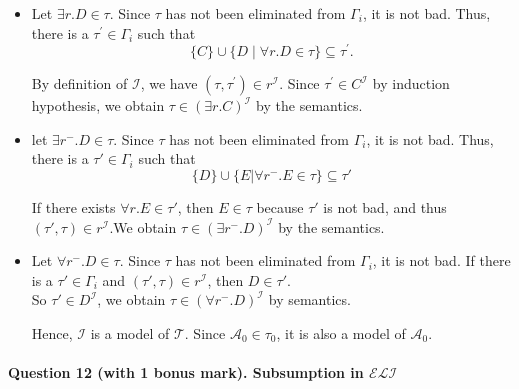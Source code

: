 \documentclass[12pt]{article}
\def \T {\mathcal{T}}
\def \A {\mathcal{A}}
\def \I {\mathcal{I}}
\begin{document}
    \begin{itemize}
        \item Let $\exists r.D \in \tau$. Since $\tau$ has not been eliminated from $\varGamma_i$, it is not bad.
        Thus, there is a $\tau^{\prime} \in \varGamma_i$ such that
        $$\{C\} \cup\{D \mid \forall r . D \in \tau\} \subseteq \tau^{\prime}.$$ \par
        By definition of $\I$, we have $(\tau, \tau^{\prime}) \in r^{\I}$. Since $\tau^{\prime} \in C^{\I}$ by induction hypothesis, we obtain $\tau \in (\exists r.C)^{\I}$ by the semantics.
        \item let $\exists r^{-}.D \in \tau$. Since $\tau$ has not been eliminated from $\varGamma_i$, it is not bad.
        Thus, there is a $\tau' \in \varGamma_i$ such that $$\{D\} \cup \{E | \forall r^{-}.E \in \tau\} \subseteq \tau'$$\par
        If there exists $\forall r.E \in \tau'$, then $E \in \tau$ because $\tau'$ is not bad, and thus $(\tau',\tau) \in r^{\I}$.We obtain $\tau \in (\exists r^{-}.D)^{\I}$ by the semantics.
        \item Let $\forall r^{-}.D \in \tau$. Since $\tau$ has not been eliminated from $\varGamma_i$, it is not bad. If there is a $\tau' \in \varGamma_i$ and $(\tau',\tau) \in r^{\I}$, then $D \in \tau'$.\\
        So $\tau' \in D^{\I}$, we obtain $\tau \in (\forall r^{-}.D)^{\I}$ by semantics. \par
        Hence, $\I$ is a model of $\T$. Since $\A_0 \in \tau_0$, it is also a model of $\A_0$.
    \end{itemize}

    \newpage
    \paragraph{Question 12 (with 1 bonus mark). Subsumption in $\mathcal{ELI}$}~{}
    \\
\end{document}
